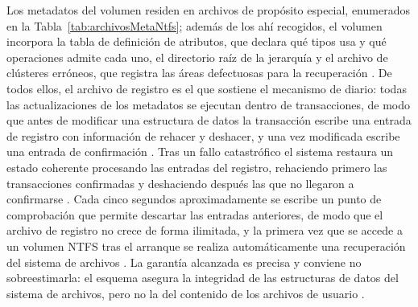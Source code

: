 \documentclass[12pt]{article}
\begin{document}
Los metadatos del volumen residen en archivos de propósito especial, enumerados en la Tabla~\ref{tab:archivosMetaNtfs}; además de los ahí recogidos, el volumen incorpora la tabla de definición de atributos, que declara qué tipos usa y qué operaciones admite cada uno, el directorio raíz de la jerarquía y el archivo de clústeres erróneos, que registra las áreas defectuosas para la recuperación \parencite[\S 22.5.1, p.\ 745]{silberschatz2006fundamentos}. De todos ellos, el archivo de registro es el que sostiene el mecanismo de diario: todas las actualizaciones de los metadatos se ejecutan dentro de transacciones, de modo que antes de modificar una estructura de datos la transacción escribe una entrada de registro con información de rehacer y deshacer, y una vez modificada escribe una entrada de confirmación \parencite[\S 22.5.2, p.\ 744]{silberschatz2006fundamentos}. Tras un fallo catastrófico el sistema restaura un estado coherente procesando las entradas del registro, rehaciendo primero las transacciones confirmadas y deshaciendo después las que no llegaron a confirmarse \parencite[\S 22.5.2, p.\ 745]{silberschatz2006fundamentos}. Cada cinco segundos aproximadamente se escribe un punto de comprobación que permite descartar las entradas anteriores, de modo que el archivo de registro no crece de forma ilimitada, y la primera vez que se accede a un volumen NTFS tras el arranque se realiza automáticamente una recuperación del sistema de archivos \parencite[\S 22.5.2, p.\ 745]{silberschatz2006fundamentos}. La garantía alcanzada es precisa y conviene no sobreestimarla: el esquema asegura la integridad de las estructuras de datos del sistema de archivos, pero no la del contenido de los archivos de usuario \parencite[\S 22.5.2, p.\ 745]{silberschatz2006fundamentos}.
\end{document}
